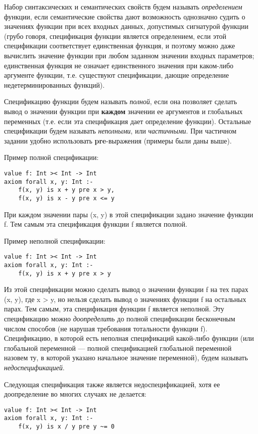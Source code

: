 
Набор синтаксических и семантических свойств будем называть \emph{определением} функции, если семантические свойства дают возможность однозначно судить о значениях функции при всех входных данных, допустимых сигнатурой функции (грубо говоря, спецификация функции является определением, если этой спецификации соответствует единственная функция, и поэтому можно даже вычислить значение функции при любом заданном значении входных параметров; единственная функция не означает единственного значения при каком-либо аргументе функции, т.е. существуют спецификации, дающие определение недетерминированных функций).

Спецификацию функции будем называть \emph{полной}, если она позволяет сделать вывод о значении функции при \textbf{каждом} значении ее аргументов и глобальных переменных (т.е. если эта спецификация дает определение функции). Остальные спецификации будем называть \emph{неполными}, или \emph{частичными}. При частичном задании удобно использовать \textbf{pre}-выражения (примеры были даны выше).

Пример полной спецификации:
\begin{lstlisting}
value f: Int >< Int -> Int
axiom forall x, y: Int :-
    f(x, y) is x + y pre x > y,
    f(x, y) is x - y pre x <= y
\end{lstlisting}
При каждом значении пары (x, y) в этой спецификации задано значение функции f. Тем самым эта спецификация функции f является полной.

Пример неполной спецификации:
\begin{lstlisting}
value f: Int >< Int -> Int
axiom forall x, y: Int :-
    f(x, y) is x + y pre x > y
\end{lstlisting}
Из этой спецификации можно сделать вывод о значении функции f на тех парах (x, y), где x > y, но нельзя сделать вывод  о значениях функции f на остальных парах. Тем самым, эта спецификация функции f является неполной. Эту спецификацию можно \emph{доопределить} до полной спецификации бесконечным числом способов (не нарушая требования тотальности функции f). Спецификацию, в которой есть неполная спецификаций какой-либо функции (или глобальной переменной --- полной спецификацией глобальной переменной назовем ту, в которой указано начальное значение переменной), будем называть \emph{недоспецификацией}.

Следующая спецификация также является недоспецификацией, хотя ее доопределение во многих случаях не делается:
\begin{lstlisting}
value f: Int >< Int -> Int
axiom forall x, y: Int :-
    f(x, y) is x / y pre y ~= 0
\end{lstlisting}

